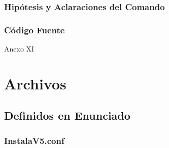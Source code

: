 \documentclass[a4paper,10pt,titlepage]{article}
\begin{document}
		\subsubsection{Hip\'otesis y Aclaraciones del Comando}

		\subsubsection{C\'odigo Fuente}
			Anexo XI

\section{Archivos}

	\subsection{Definidos en Enunciado}
		
		\subsubsection{InstalaV5.conf}
\end{document}

